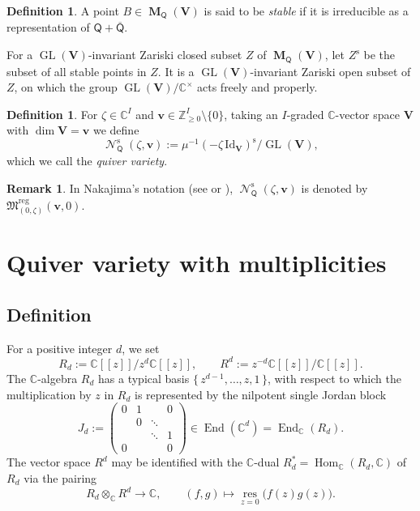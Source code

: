 \documentclass[11pt]{article}
\numberwithin{equation}{section}
\theoremstyle{definition}
\newtheorem{Definition}[Theorem]{Definition}
\newtheorem{Remark}[Theorem]{Remark}
\newcommand{\Z}{\mathbb{Z}} %
\newcommand{\C}{\mathbb{C}} %
\newcommand{\GL}{\operatorname{GL}} %
\newcommand{\End}{\operatorname{End}}
\newcommand{\Hom}{\operatorname{Hom}}
\newcommand{\unit}{\mathrm{Id}}
\newcommand{\bM}{\operatorname{\mathbf{M}}}
\newcommand{\bV}{\mathbf{V}}
\newcommand{\bv}{\mathbf{v}}
\newcommand{\ov}{\overline}
\newcommand{\res}{\operatorname*{res}}
\newcommand{\st}{\mathrm{s}}
\newcommand{\Qst}{\operatorname{\mathscr{N}}^\mathrm{s}}
\newcommand{\QQ}{\mathsf{Q}} %
\begin{document}
\begin{Definition}\label{dfn:stable}
A point $B \in \bM_\QQ(\bV)$ is said to be {\em stable}
if it is irreducible as a representation of $\QQ + \ov{\QQ}$.
\end{Definition}

For a $\GL(\bV)$-invariant Zariski closed subset $Z$ of $\bM_\QQ(\bV)$,
let $Z^\st$ be the subset of all stable points in $Z$.
It is a $\GL(\bV)$-invariant Zariski open subset of $Z$,
on which the group $\GL(\bV)/\C^\times$ acts
freely and properly.

\begin{Definition}\label{dfn:q-variety}
For $\zeta \in \C^I$ and $\bv \in \Z_{\geq 0}^I \setminus \{ 0 \}$,
taking an $I$-graded $\C$-vector space $\bV$ with $\dim \bV = \bv$
we def\/ine
\[
\Qst_\QQ(\zeta,\bv) := \mu^{-1}(-\zeta\,\unit_\bV)^\st / \GL(\bV),
\]
which we call the {\em quiver variety}.
\end{Definition}

\begin{Remark}\label{rem:nakajima}
In Nakajima's notation (see \cite{MR1302318} or \cite{MR2023313}),
$\Qst_\QQ(\zeta,\bv)$ is denoted by
$\mathfrak{M}^\mathrm{reg}_{(0,\zeta)}(\bv,0)$.
\end{Remark}



\section{Quiver variety with multiplicities}\label{sec:q-multi}

\subsection{Def\/inition}\label{subsec:dfn}

For a positive integer $d$, we set
\[
R_d := \C[[z]]/z^d\C[[z]], \qquad R^d := z^{-d}\C[[z]]/\C[[z]].
\]
The $\C$-algebra $R_d$ has a typical basis $\{\, z^{d-1}, \dots ,z,1 \,\}$,
with respect to which
the multiplication by $z$ in $R_d$ is represented by
the nilpotent single Jordan block
\[
J_d := \begin{pmatrix}
                        0     & 1 &        & 0 \\
                              & 0 & \ddots &   \\
                              &   & \ddots & 1   \\
                        0     &   &        & 0 \end{pmatrix}
\in \End(\C^d)=\End_\C(R_d).
\]
The vector space $R^d$ may be identif\/ied with
the $\C$-dual $R_d^* =\Hom_\C (R_d,\C)$ of $R_d$ via the pairing
\[
R_d \otimes_\C R^d \to \C, \qquad (f,g) \mapsto
\res_{z=0} \bigl( f(z)g(z) \bigr).
\]
\end{document}
